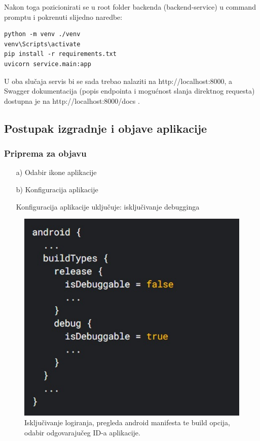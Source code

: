 		Nakon toga pozicionirati se u root folder backenda (backend-service) u command promptu i pokrenuti slijedno naredbe:
		
		\begin{lstlisting}
python -m venv ./venv
venv\Scripts\activate
pip install -r requirements.txt
uvicorn service.main:app \end{lstlisting}
		
		
		U oba slučaja servis bi se sada trebao nalaziti na http://localhost:8000, a Swagger dokumentacija (popis endpointa i mogućnost slanja direktnog requesta) dostupna je na http://localhost:8000/docs .
		
		\subsection{Postupak izgradnje i objave aplikacije}
		
		\subsubsection{Priprema za objavu}
		\begin{enumerate}
			\item[a)] Odabir ikone aplikacije
			\item[b)] Konfiguracija aplikacije
			
			Konfiguracija aplikacije uključuje: isključivanje debugginga
		\end{enumerate}
		
		\begin{figure}[H]
			\includegraphics[scale=0.6]{slike/deploy2.jpg} %
			\centering
			\caption{Isključivanje logiranja, pregleda android manifesta te build opcija, odabir odgovarajučeg ID-a aplikacije.}
			\label{fig:deploy2}
		\end{figure}
		
